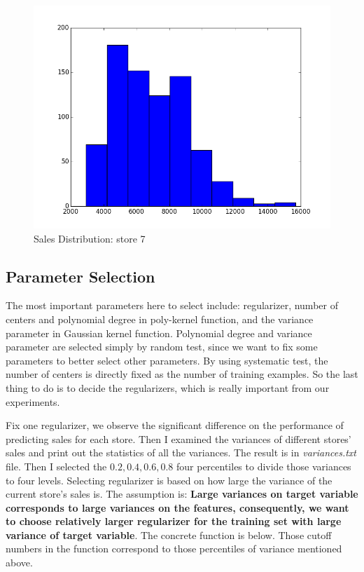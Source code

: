 \documentclass[11pt]{article}
\begin{document}
\begin{figure}[ht]
	\centering
	\includegraphics[scale = 0.5]{sales_histogram2}
	\caption{Sales Distribution: store 7 \label{fig:figure2}}
\end{figure}

\newpage

\subsection{Parameter Selection}

The most important parameters here to select include: regularizer, number of centers and polynomial degree in poly-kernel function, and the variance parameter in Gaussian kernel function. Polynomial degree and variance parameter are selected simply by random test, since we want to fix some parameters to better select other parameters. By using systematic test, the number of centers is directly fixed as the number of training examples. So the last thing to do is to decide the regularizers, which is really important from our experiments. 

Fix one regularizer, we observe the significant difference on the performance of predicting sales for each store. Then I examined the variances of different stores' sales and print out the statistics of all the variances. The result is in \emph{variances.txt} file. Then I selected the $0.2, 0.4, 0.6, 0.8$ four percentiles to divide those variances to four levels. Selecting regularizer is based on how large the variance of the current store's sales is. The assumption is: \textbf{Large variances on target variable corresponds to large variances on the features, consequently, we want to choose relatively larger regularizer for the training set with large variance of target variable}. The concrete function is below. Those cutoff numbers in the function correspond to those percentiles of variance mentioned above. 
\end{document}
